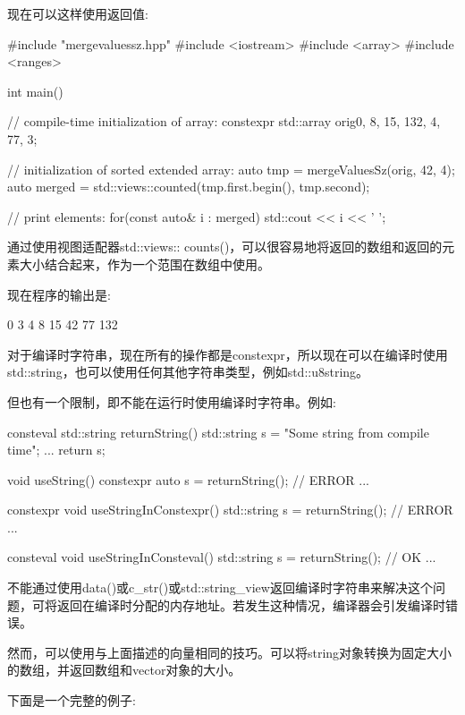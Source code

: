 现在可以这样使用返回值:


\begin{cpp}
#include "mergevaluessz.hpp"
#include <iostream>
#include <array>
#include <ranges>

int main()
{
	// compile-time initialization of array:
	constexpr std::array orig{0, 8, 15, 132, 4, 77, 3};
	
	// initialization of sorted extended array:
	auto tmp = mergeValuesSz(orig, 42, 4);
	auto merged = std::views::counted(tmp.first.begin(), tmp.second);
	
	// print elements:
	for(const auto& i : merged) {
		std::cout << i << ' ';
	}
}
\end{cpp}

通过使用视图适配器std::views:: counts()，可以很容易地将返回的数组和返回的元素大小结合起来，作为一个范围在数组中使用。

现在程序的输出是:

\begin{shell}
0 3 4 8 15 42 77 132
\end{shell}


对于编译时字符串，现在所有的操作都是constexpr，所以现在可以在编译时使用std::string，也可以使用任何其他字符串类型，例如std::u8string。

但也有一个限制，即不能在运行时使用编译时字符串。例如:

\begin{cpp}
consteval std::string returnString()
{
	std::string s = "Some string from compile time";
	...
	return s;
}

void useString()
{
	constexpr auto s = returnString(); // ERROR
	...
}

constexpr void useStringInConstexpr()
{
	std::string s = returnString(); // ERROR
	...
}

consteval void useStringInConsteval()
{
	std::string s = returnString(); // OK
	...
}
\end{cpp}

不能通过使用data()或c\_str()或std::string\_view返回编译时字符串来解决这个问题，可将返回在编译时分配的内存地址。若发生这种情况，编译器会引发编译时错误。

然而，可以使用与上面描述的向量相同的技巧。可以将string对象转换为固定大小的数组，并返回数组和vector对象的大小。

下面是一个完整的例子:

